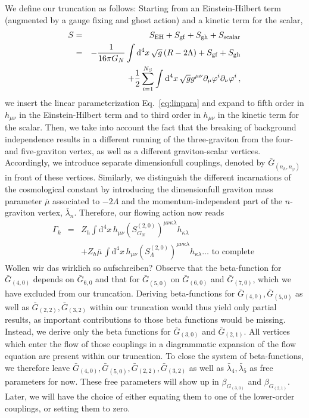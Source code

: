 \documentclass[11pt]{book} %
\newcommand{\bea}{\begin{eqnarray}}
\newcommand{\eea}{\end{eqnarray}}
\begin{document}
We define our truncation as follows:
Starting from an Einstein-Hilbert term (augmented by a gauge fixing and ghost action) and a kinetic term for the scalar,
\bea
S &=& S_{\rm EH} + S_{\rm gf} + S_{\rm gh} + S_{\rm scalar}\nonumber\\
&=& -\frac{1}{16 \pi G_N} \int \mathrm d^4 x\, \sqrt{g}\left(R - 2 \Lambda \right)+ S_{\rm gf} + S_{\rm gh} \nonumber\\
&{}&+\frac{1}{2}\sum_{i=1}^{N_S} \int \mathrm  d^4 x\, \sqrt{g} g^{\mu \nu} \partial_{\mu}\varphi^i\partial_{\nu}\varphi^i\,,
\eea
we insert the linear parameterization Eq.~\eqref{eq:linpara} and
expand to fifth order in $h_{\mu \nu}$ in the Einstein-Hilbert term and
to third order in $h_{\mu \nu}$ in the kinetic term for the scalar.
Then, we take into account the fact that the breaking of background independence
results in a different running of the three-graviton from the four- and five-graviton vertex,
as well as a different graviton-scalar vertices.
Accordingly, we introduce separate dimensionfull couplings, denoted by $\bar{G}_{(n_h, n_{\varphi})}$ in front of these vertices.
Similarly, we distinguish the different incarnations of the cosmological constant
by introducing the dimensionfull graviton mass parameter $\bar{\mu}$ associated to $- 2 \Lambda$ and
the momentum-independent part of the $n$-graviton vertex, $\bar{\lambda}_n$.
Therefore, our flowing action now reads
\bea
\Gamma_k& =& Z_h \int \mathrm d^4 x\, h_{\mu \nu} \left(S_{G_N}^{(2,0)}\right)^{\mu \nu \kappa \lambda}h_{\kappa \lambda} \nonumber\\
&{}&+ Z_h \bar{\mu}\, \int \mathrm  d^4 x\, h_{\mu \nu} \left(S_{\Lambda}^{(2,0)}\right)^{\mu \nu \kappa \lambda}h_{\kappa \lambda} \dots \mbox{ to complete }
\eea
{\colmr Wollen wir das wirklich so aufschreiben?}
Observe that the beta-function for $\bar{G}_{(4,0)}$ depends on $\bar{G}_{6,0}$ and
that for $\bar{G}_{(5,0)}$ on $\bar{G}_{(6,0)}$ and $\bar{G}_{(7,0)}$,
which we have excluded from our truncation.
Deriving beta-functions for $\bar{G}_{(4,0)}, \bar{G}_{(5,0)}$ as well as $\bar{G}_{(2,2)}, \bar{G}_{(3,2)}$ within our truncation
would thus yield only partial results, as important contributions to those beta functions would be missing.
Instead, we derive only the beta functions for $\bar{G}_{(3,0)}$ and $\bar{G}_{(2,1)}$.
All vertices which enter the flow of those couplings in a diagrammatic expansion of the flow equation are present within our truncation.
To close the system of beta-functions, we therefore leave $\bar{G}_{(4,0)}, \bar{G}_{(5,0)}, \bar{G}_{(2,2)}, \bar{G}_{(3,2)}$ as well as $\bar{\lambda}_4, \bar{\lambda}_5$ as free parameters for now.
These free parameters will show up in $\beta_{G_{(3,0)}}$ and $\beta_{G_{(2,1)}}$.
Later, we will have the choice of either equating them to one of the lower-order couplings, or setting them to zero.
\end{document}
